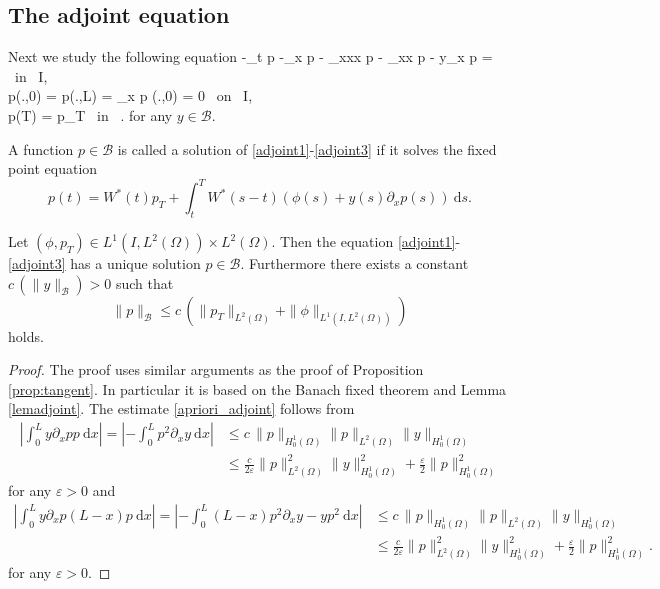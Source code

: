 \subsection{The adjoint equation}
\label{appendixadjoint}
Next we study the following equation
\besn
-\partial_t p -\partial_x p - \partial_{xxx} p - \gamma \partial_{xx} p  - y\partial_x p =  \phi \mbox{ in } I\times\Omega,\label{adjoint1}\\
p(.,0) = p(.,L) = \partial_x p (.,0) = 0 \mbox{ on } I,\label{adjoint2}\\
p(T) = p_{T} \mbox{ in } \Omega.\label{adjoint3}
\eesn
for any $y\in \mathcal B$.
\begin{Def}
A function $p\in \mathcal B$ is called a solution of \eqref{adjoint1}-\eqref{adjoint3} if it solves the fixed point equation
\[
p(t)=W^*(t)p_T+\int_t^TW^*(s-t)(\phi(s)+y(s)\partial_x p(s))~\mathrm ds.
\]
\end{Def}
\begin{prop}
Let $(\phi,p_T)\in L^1(I,L^2(\Omega))\times L^2(\Omega)$. Then the equation \eqref{adjoint1}-\eqref{adjoint3} has a unique solution $p\in \mathcal B$. Furthermore there exists a constant $c\,(\|y\|_{\mathcal B})>0$ such that
\begin{equation}\label{apriori_adjoint}
\|p\|_{\mathcal B}\leq c\,(\|p_T\|_{L^2(\Omega)}+\|\phi\|_{L^1(I,L^2(\Omega))})
\end{equation}
holds.
\end{prop}
\begin{proof}
The proof uses similar arguments as the proof of Proposition \ref{prop:tangent}. In particular it is based on the Banach fixed theorem and Lemma \eqref{lemadjoint}. The estimate \eqref{apriori_adjoint} follows from
\begin{align*}
\left|\int_0^Ly\partial_xpp~\mathrm dx\right|=\left|-\int_0^Lp^2\partial_xy~\mathrm dx\right|&\leq c\,\|p\|_{H^1_0(\Omega)}\|p\|_{L^2(\Omega)}\|y\|_{H^1_0(\Omega)}\\
&\leq \frac{c}{2\varepsilon}\|p\|_{L^2(\Omega)}^2\|y\|_{H^1_0(\Omega)}^2+\frac{\varepsilon}{2}\|p\|_{H^1_0(\Omega)}^2
\end{align*}
for any $\varepsilon>0$ and
\begin{align*}
\left|\int_0^Ly\partial_xp(L-x)p~\mathrm dx\right|=\left|-\int_0^L(L-x)p^2\partial_xy-yp^2~\mathrm dx\right|&\leq c\,\|p\|_{H^1_0(\Omega)}\|p\|_{L^2(\Omega)}\|y\|_{H^1_0(\Omega)}\\
&\leq \frac{c}{2\varepsilon}\|p\|_{L^2(\Omega)}^2\|y\|_{H^1_0(\Omega)}^2+\frac{\varepsilon}{2}\|p\|_{H^1_0(\Omega)}^2.
\end{align*}
for any $\varepsilon>0$.
\end{proof}
